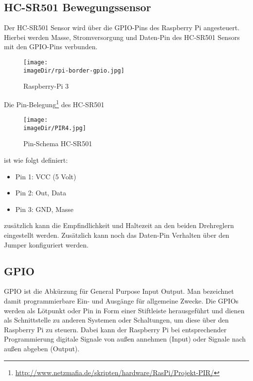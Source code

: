 \subsection{HC-SR501 Bewegungssensor}

Der HC-SR501 Sensor wird über die GPIO-Pins des Raspberry Pi angesteuert. Hierbei werden Masse, Stromversorgung und Daten-Pin des HC-SR501 Sensors mit den GPIO-Pins verbunden. 

\begin{figure}[h]
	\centering
	\texttt{[image: \\imageDir/rpi-border-gpio.jpg]}
	\caption{Raspberry-Pi 3}
	\label{fig:rpi-border-gpio}
\end{figure}

Die Pin-Belegung\footnote{\url{http://www.netzmafia.de/skripten/hardware/RasPi/Projekt-PIR/}} des HC-SR501

\begin{figure}[h]
	\centering
	\texttt{[image: \\imageDir/PIR4.jpg]}
	\caption{Pin-Schema HC-SR501}
	\label{fig:PIR4}
\end{figure}

ist wie folgt definiert:

\begin{itemize}
	\item Pin 1: VCC (5 Volt)
	\item Pin 2: Out, Data
	\item Pin 3: GND, Masse
\end{itemize}

zusätzlich kann die Empfindlichkeit und Haltezeit an den beiden Drehreglern eingestellt werden. Zusätzlich kann noch das Daten-Pin Verhalten über den Jumper konfiguriert werden.

\pagebreak

\subsection{GPIO}

GPIO ist die Abkürzung für General Purpose Input Output. Man bezeichnet damit programmierbare Ein- und Ausgänge für allgemeine Zwecke. Die GPIOs werden als Lötpunkt oder Pin in Form einer Stiftleiste herausgeführt und dienen als Schnittstelle zu anderen Systemen oder Schaltungen, um diese über den Raspberry Pi zu steuern. Dabei kann der Raspberry Pi bei entsprechender Programmierung digitale Signale von außen annehmen (Input) oder Signale nach außen abgeben (Output).\\

